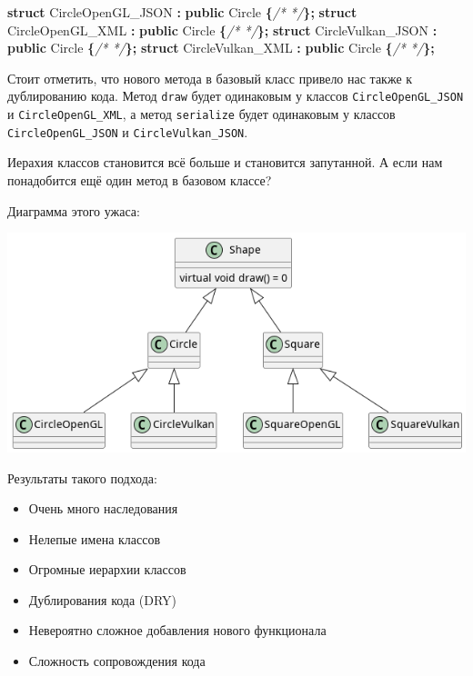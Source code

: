 \documentclass[14pt,a4paper]{article}
\providecommand{\tightlist}{%
	\setlength{\itemsep}{0pt}\setlength{\parskip}{0pt}}
\newenvironment{Shaded}{\begin{paragraph}}{\end{paragraph}}
\newenvironment{Highlighting}{\begin{paragraph}}{\end{paragraph}}
\newcommand{\KeywordTok}[1]{\textcolor[rgb]{0.13,0.29,0.53}{\textbf{#1}}}
\newcommand{\CommentTok}[1]{\textcolor[rgb]{0.56,0.35,0.01}{\textit{#1}}}
\newcommand{\OperatorTok}[1]{\textcolor[rgb]{0.81,0.36,0.00}{\textbf{#1}}}
\newcommand{\NormalTok}[1]{#1}
\begin{document}
\begin{Shaded}
\begin{Highlighting}[]
\KeywordTok{struct}\NormalTok{ CircleOpenGL\_JSON }\OperatorTok{:} \KeywordTok{public}\NormalTok{ Circle }\OperatorTok{\{}\CommentTok{/* */}\OperatorTok{\};}
\KeywordTok{struct}\NormalTok{ CircleOpenGL\_XML }\OperatorTok{:} \KeywordTok{public}\NormalTok{ Circle }\OperatorTok{\{}\CommentTok{/* */}\OperatorTok{\};}
\KeywordTok{struct}\NormalTok{ CircleVulkan\_JSON }\OperatorTok{:} \KeywordTok{public}\NormalTok{ Circle }\OperatorTok{\{}\CommentTok{/* */}\OperatorTok{\};}
\KeywordTok{struct}\NormalTok{ CircleVulkan\_XML }\OperatorTok{:} \KeywordTok{public}\NormalTok{ Circle }\OperatorTok{\{}\CommentTok{/* */}\OperatorTok{\};}
\end{Highlighting}
\end{Shaded}

Стоит отметить, что нового метода в базовый класс привело нас также к
дублированию кода. Метод \texttt{draw} будет одинаковым у классов
\texttt{CircleOpenGL\_JSON} и \texttt{CircleOpenGL\_XML}, а метод
\texttt{serialize} будет одинаковым у классов
\texttt{CircleOpenGL\_JSON} и \texttt{CircleVulkan\_JSON}.

Иерахия классов становится всё больше и становится запутанной. А если
нам понадобится ещё один метод в базовом классе?

Диаграмма этого ужаса:

\includegraphics{OldPoly.png}

Результаты такого подхода:

\begin{itemize}
\tightlist
\item
  Очень много наследования
\item
  Нелепые имена классов
\item
  Огромные иерархии классов
\item
  Дублирования кода (DRY)
\item
  Невероятно сложное добавления нового функционала
\item
  Сложность сопровождения кода
\end{itemize}
\end{document}

